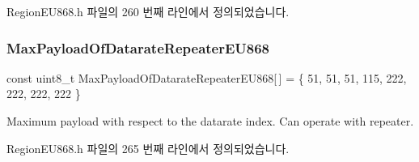 Region\+E\+U868.\+h 파일의 260 번째 라인에서 정의되었습니다.

\mbox{\label{group___r_e_g_i_o_n_e_u868_ga1d8f4e80003a6ff84006b0082f310f5a}} 
\subsubsection{\texorpdfstring{Max\+Payload\+Of\+Datarate\+Repeater\+E\+U868}{MaxPayloadOfDatarateRepeaterEU868}}
{\footnotesize\ttfamily const uint8\+\_\+t Max\+Payload\+Of\+Datarate\+Repeater\+E\+U868\mbox{[}$\,$\mbox{]} = \{ 51, 51, 51, 115, 222, 222, 222, 222 \}\hspace{0.3cm}{\ttfamily [static]}}

Maximum payload with respect to the datarate index. Can operate with repeater. 

Region\+E\+U868.\+h 파일의 265 번째 라인에서 정의되었습니다.

